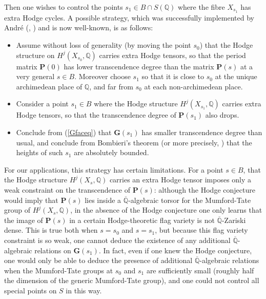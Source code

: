 \documentclass[10pt]{article}
\numberwithin{equation}{section}
\theoremstyle{plain}
\theoremstyle{definition}
\theoremstyle{remark}
\newcommand{\Qbar}{\overline{\mathbb{Q}}}
\begin{document}
Then one wishes to control the points $s_{1} \in B \cap S(\mathbb{Q})$ where the fibre $X_{s_{1}}$ has extra Hodge cycles. A possible strategy, which was successfully implemented by Andr\'e (\cite[Ch. IX]{2025arXiv250109867A}, \cite[Thm. 1]{zbMATH00764346}) and is now well-known, is as follows:
\begin{itemize}
\item[(1)] Assume without loss of generality (by moving the point $s_0$) that the Hodge structure on $H^{j}(X_{s_{0}}, \mathbb{Q})$ carries extra Hodge tensors, so that the period matrix $\mathbf{P}(0)$ has lower transcendence degree than the matrix $\mathbf{P}(s)$ at a very general $s \in B$. Moreover choose $s_{1}$ so that it is close to $s_{0}$ at the unique archimedean place of $\mathbb{Q}$, and far from $s_{0}$ at each non-archimedean place.
\item[(2)] Consider a point $s_{1} \in B$ where the Hodge structure $H^{j}(X_{s_{1}}, \mathbb{Q})$ carries extra Hodge tensors, so that the transcendence degree of $\mathbf{P}(s_{1})$ also drops.
\item[(3)] Conclude from (\ref{Gfaceq}) that $\mathbf{G}(s_{1})$ has smaller transcendence degree than usual, and conclude from Bombieri's theorem \cite{zbMATH03721021} (or more precisely, ) that the heights of such $s_{1}$ are absolutely bounded. 
\end{itemize}
For our applications, this strategy has certain limitations. For a point $s \in B$, that the Hodge structure $H^{j}(X_{s}, \mathbb{Q})$ carries an extra Hodge tensor imposes only a weak constraint on the transcendence of $\mathbf{P}(s)$: although the Hodge conjecture would imply that $\mathbf{P}(s)$ lies inside a $\overline{\mathbb{Q}}$-algebraic torsor for the Mumford-Tate group of $H^{j}(X_{s}, \mathbb{Q})$, in the absence of the Hodge conjecture one only learns that the image of $\mathbf{P}(s)$ in a certain Hodge-theoretic flag variety is not $\overline{\mathbb{Q}}$-Zariski dense. This is true both when $s = s_{0}$ and $s = s_{1}$, but because this flag variety constraint is so weak, one cannot deduce the existence of any additional $\overline{\mathbb{Q}}$-algebraic relations on $\mathbf{G}(s_{1})$. In fact, even if one knew the Hodge conjecture, one would only be able to deduce the presence of additional $\Qbar$-algebraic relations when the Mumford-Tate groups at $s_0$ and $s_1$ are sufficiently small (roughly half the dimension of the generic Mumford-Tate group), and one could not control all special points on $S$ in this way.
\end{document}
